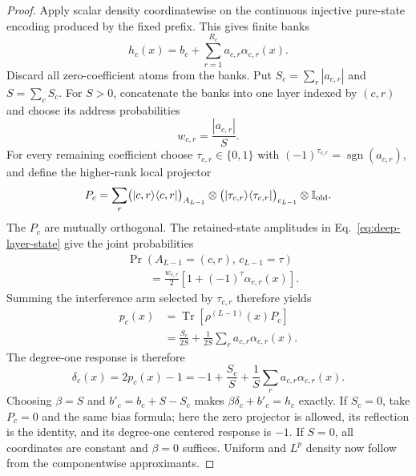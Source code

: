 \documentclass[pdflatex,sn-mathphys,NameDate,iicol]{sn-jnl}
\newcommand{\Tr}{\operatorname{Tr}}
\newcommand{\id}{\mathbb{I}}
\newcommand{\proj}[1]{\ket{#1}\!\bra{#1}}
\begin{document}
\begin{proof}
Apply scalar density coordinatewise on the continuous injective pure-state
encoding produced by the fixed prefix. This gives finite banks
\begin{equation}
 h_c(x)=b_c+\sum_{r=1}^{R_c}a_{c,r}\alpha_{c,r}(x).
 \label{eq:deep-class-banks}
\end{equation}
 Discard all zero-coefficient atoms from the banks. Put
 $S_c=\sum_r|a_{c,r}|$ and $S=\sum_cS_c$. For $S>0$, concatenate the
 banks into one layer indexed by $(c,r)$ and choose its address probabilities
\begin{equation}
 w_{c,r}=\frac{|a_{c,r}|}{S}.
 \label{eq:deep-compilation-weights}
\end{equation}
 For every remaining coefficient choose
$\tau_{c,r}\in\{0,1\}$ with
$(-1)^{\tau_{c,r}}=\operatorname{sgn}(a_{c,r})$, and define the higher-rank
local projector
\begin{equation}
 P_c=
 \sum_r \bigl(\proj{c,r}\bigr)_{A_{L-1}}
 \otimes\bigl(\proj{\tau_{c,r}}\bigr)_{c_{L-1}}
 \otimes\id_{\rm old}.
 \label{eq:deep-compilation-projector}
\end{equation}
 The $P_c$ are mutually orthogonal. The retained-state amplitudes in
 Eq.~\eqref{eq:deep-layer-state} give the joint probabilities
 \begin{equation}
  \begin{aligned}
  &\Pr\!\left(A_{L-1}=(c,r),\,c_{L-1}=\tau\right)\\
  &\qquad=\frac{w_{c,r}}{2}
  \left[1+(-1)^\tau\alpha_{c,r}(x)\right].
  \end{aligned}
  \label{eq:deep-compilation-joint-probability}
 \end{equation}
 Summing the interference arm selected by $\tau_{c,r}$ therefore yields
\begin{equation}
 \begin{aligned}
 p_c(x)
 &=\Tr\!\left[\rho^{(L-1)}(x)P_c\right]\\
 &=\frac{S_c}{2S}
   +\frac{1}{2S}\sum_r a_{c,r}\alpha_{c,r}(x).
 \end{aligned}
 \label{eq:deep-compilation-overlap}
\end{equation}
The degree-one response is therefore
\begin{equation}
 \delta_c(x)=2p_c(x)-1
 =-1+\frac{S_c}{S}
   +\frac{1}{S}\sum_r a_{c,r}\alpha_{c,r}(x).
 \label{eq:deep-compilation-response}
\end{equation}
 Choosing $\beta=S$ and $b'_c=b_c+S-S_c$ makes
 $\beta\delta_c+b'_c=h_c$ exactly. If $S_c=0$, take $P_c=0$ and the same
 bias formula; here the zero projector is allowed, its reflection is the
 identity, and its degree-one centered response is $-1$. If $S=0$, all
 coordinates are constant and $\beta=0$ suffices.
Uniform and $L^p$ density now follow from the componentwise approximants.
\end{proof}
\end{document}

